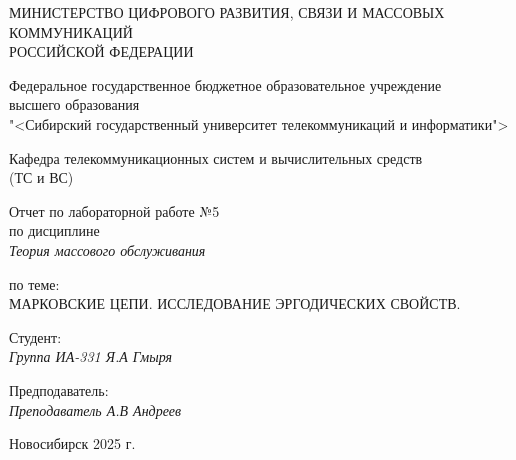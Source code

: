 \thispagestyle{empty}

\begin{center}
    МИНИСТЕРСТВО ЦИФРОВОГО РАЗВИТИЯ, СВЯЗИ И МАССОВЫХ КОММУНИКАЦИЙ \\ РОССИЙСКОЙ ФЕДЕРАЦИИ

    \vspace{20pt}

    Федеральное государственное бюджетное образовательное учреждение  \\  высшего образования \\
    "<Сибирский государственный университет телекоммуникаций и информатики"> \\

    \vspace{20pt}

    Кафедра телекоммуникационных систем и вычислительных средств \\  (ТС и ВС)
\end{center}

\vfill

\begin{center}
    Отчет по лабораторной работе №5 \\  
    по дисциплине \\
    \textit{Теория массового обслуживания}

    \vspace{20pt} 
    по теме: \\
    \uppercase{Марковские цепи. Исследование эргодических свойств.
}
\end{center}

\vfill

    \noindent Студент: \\
    \textit{Группа ИА-331 \hfill Я.А Гмыря}

    \vspace{20pt}

    \noindent Предподаватель: \\
    \textit{Преподаватель \hfill А.В Андреев}

\vfill

\begin{center}
    Новосибирск 2025 г.
\end{center}